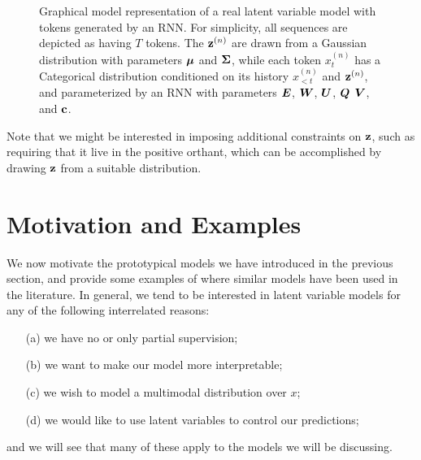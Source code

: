 \documentclass{article}
\begin{document}
\begin{figure}
\centering
{}
 \caption{Graphical model representation of a real latent variable model with tokens generated by an RNN. For simplicity, all sequences are depicted as having $T$ tokens. The $\mathbf{z}^{(n)}$ are drawn from a Gaussian distribution with parameters $\boldsymbol{\mu}$ and $\boldsymbol{\Sigma}$, while each token $x^{(n)}_t$ has a Categorical distribution conditioned on its history $x^{(n)}_{<t}$ and $\mathbf{z}^{(n)}$, and parameterized by an RNN with parameters $\boldsymbol{E}$, $\boldsymbol{W}$, $\boldsymbol{U}$, $\boldsymbol{Q}$ $\boldsymbol{V}$, and $\mathbf{c}$.}
 \label{fig:realrnngm}
\end{figure}


Note that we might be interested in imposing additional constraints on $\mathbf{z}$, such as requiring that it live in the positive orthant, which can be accomplished by drawing $\mathbf{z}$ from a suitable distribution. 



\section{Motivation and Examples}
We now motivate the prototypical models we have introduced in the previous section, and provide some examples of where similar models have been used in the literature. In general, we tend to be interested in latent variable models for any of the following interrelated reasons:
\begin{itemize}
\item[(a)] we have no or only partial supervision;
\item[(b)] we want to make our model more interpretable;
\item[(c)] we wish to model a multimodal distribution over $x$; 
\item[(d)] we would like to use latent variables to control our predictions; 
\end{itemize}
and we will see that many of these apply to the models we will be discussing.
\end{document}
